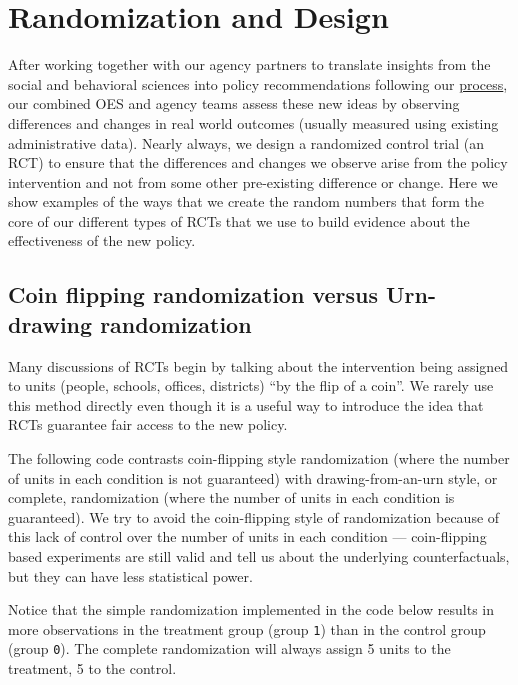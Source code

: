 \documentclass[
  12pt,
]{book}
\theoremstyle{definition}
\theoremstyle{definition}
\theoremstyle{definition}
\theoremstyle{remark}
\begin{document}
\hypertarget{randomization-and-design}{%
\chapter{Randomization and Design}\label{randomization-and-design}}

After working together with our agency partners to translate insights
from the social and behavioral sciences into policy recommendations
following our \href{https://oes.gsa.gov/methods/}{process}, our combined
OES and agency teams assess these new ideas by observing differences and
changes in real world outcomes (usually measured using existing
administrative data). Nearly always, we design a randomized control
trial (an RCT) to ensure that the differences and changes we observe
arise from the policy intervention and not from some other pre-existing
difference or change. Here we show examples of the ways that we create
the random numbers that form the core of our different types of RCTs
that we use to build evidence about the effectiveness of the new policy.

\hypertarget{coin-flipping-randomization-versus-urn-drawing-randomization}{%
\section{Coin flipping randomization versus Urn-drawing
randomization}\label{coin-flipping-randomization-versus-urn-drawing-randomization}}

Many discussions of RCTs begin by talking about the intervention being
assigned to units (people, schools, offices, districts) ``by the flip of
a coin''. We rarely use this method directly even though it is a useful
way to introduce the idea that RCTs guarantee fair access to the new
policy.

The following code contrasts coin-flipping style randomization (where
the number of units in each condition is not guaranteed) with
drawing-from-an-urn style, or complete, randomization (where the number
of units in each condition is guaranteed). We try to avoid the
coin-flipping style of randomization because of this lack of control
over the number of units in each condition --- coin-flipping based
experiments are still valid and tell us about the underlying
counterfactuals, but they can have less statistical power.

Notice that the simple randomization implemented in the code below
results in more observations in the treatment group (group \texttt{1})
than in the control group (group \texttt{0}). The complete randomization
will always assign 5 units to the treatment, 5 to the control.
\end{document}
